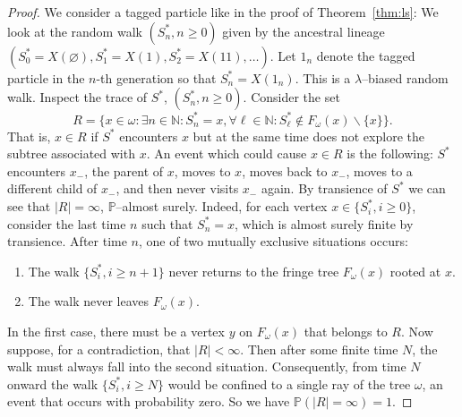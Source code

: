 \documentclass[11 pt]{article}
\theoremstyle{definition}
\numberwithin{equation}{section}
\newcommand{\PP}{\mathbb{P}} %
\begin{document}
	\begin{proof}
	
	We consider a tagged particle like in the proof of Theorem~\ref{thm:ls}: We look at the random walk $(S^*_n, n\ge 0)$ given by the ancestral lineage $(S^*_0 = X (\varnothing), S^*_1 = X(1), S^*_2 = X(11), \ldots)$. Let $1_n$ denote the tagged particle in the $n$-th generation so that $S_n^*=X(1_n)$. This is a $\lambda$--biased random walk. Inspect the trace of $S^*$, $(S^*_n, n\geq 0)$. Consider the set 
	\begin{equation*}
		R = \big \{x \in \omega: \exists n \in \mathbb{N}: S^*_n=x, \forall \ell \in \mathbb{N}: S^*_\ell \notin F_{\omega}(x)\backslash \{x\} \big\}.
	\end{equation*}
	That is, $x\in R$ if $S^*$ encounters $x$ but at the same time does not explore the subtree associated with $x$. An event which could cause $x \in R$ is the following: $S^*$ encounters $x_-$, the parent of $x$, moves to $x$, moves back to $x_-$, moves to a different child of $x_-$, and then never visits $x_-$ again. By transience of $S^*$ we can see that $\vert R \vert = \infty$, $\PP$--almost surely. 
	Indeed, for each vertex $x \in \{S^*_i, i \ge 0\}$, consider the last time $n$ such that $S^*_n = x$, which is almost surely finite by transience. After time $n$, one of two mutually exclusive situations occurs:
	\begin{enumerate}
		\item  The walk $\{S^*_i, i \ge n+1\}$ never returns to the fringe tree $F_\omega(x)$ rooted at $x$. 
		\item The walk never leaves $F_\omega(x)$. 
	\end{enumerate}
	In the first case, there must be a vertex $y$ on $F_\omega(x)$ that belongs to $R$.
	Now suppose, for a contradiction, that $|R| < \infty$. Then after some finite time $N$, the walk must always fall into the second situation. Consequently, from time $N$ onward the walk $\{S^*_i, i \ge N\}$ would be confined to a single ray of the tree $\omega$, an event that occurs with probability zero. So we have $\PP(|R| = \infty)=1$. 
	

\end{proof}
\end{document}
